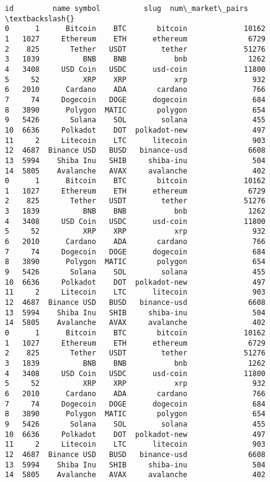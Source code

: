 \documentclass[11pt]{article}
\makeatletter
\newcommand{\boxspacing}{\kern\kvtcb@left@rule\kern\kvtcb@boxsep}
\newcommand{\prompt}[4]{
        {\ttfamily\llap{{\color{#2}[#3]:\hspace{3pt}#4}}\vspace{-\baselineskip}}
    }
\makeatother
\begin{document}
            \begin{tcolorbox}[breakable, size=fbox, boxrule=.5pt, pad at break*=1mm, opacityfill=0]
\prompt{Out}{outcolor}{49}{\boxspacing}
\begin{Verbatim}[commandchars=\\\{\}]
      id         name symbol          slug  num\_market\_pairs  \textbackslash{}
0      1      Bitcoin    BTC       bitcoin             10162
1   1027     Ethereum    ETH      ethereum              6729
2    825       Tether   USDT        tether             51276
3   1839          BNB    BNB           bnb              1262
4   3408     USD Coin   USDC      usd-coin             11800
5     52          XRP    XRP           xrp               932
6   2010      Cardano    ADA       cardano               766
7     74     Dogecoin   DOGE      dogecoin               684
8   3890      Polygon  MATIC       polygon               654
9   5426       Solana    SOL        solana               455
10  6636     Polkadot    DOT  polkadot-new               497
11     2     Litecoin    LTC      litecoin               903
12  4687  Binance USD   BUSD   binance-usd              6608
13  5994    Shiba Inu   SHIB     shiba-inu               504
14  5805    Avalanche   AVAX     avalanche               402
0      1      Bitcoin    BTC       bitcoin             10162
1   1027     Ethereum    ETH      ethereum              6729
2    825       Tether   USDT        tether             51276
3   1839          BNB    BNB           bnb              1262
4   3408     USD Coin   USDC      usd-coin             11800
5     52          XRP    XRP           xrp               932
6   2010      Cardano    ADA       cardano               766
7     74     Dogecoin   DOGE      dogecoin               684
8   3890      Polygon  MATIC       polygon               654
9   5426       Solana    SOL        solana               455
10  6636     Polkadot    DOT  polkadot-new               497
11     2     Litecoin    LTC      litecoin               903
12  4687  Binance USD   BUSD   binance-usd              6608
13  5994    Shiba Inu   SHIB     shiba-inu               504
14  5805    Avalanche   AVAX     avalanche               402
0      1      Bitcoin    BTC       bitcoin             10162
1   1027     Ethereum    ETH      ethereum              6729
2    825       Tether   USDT        tether             51276
3   1839          BNB    BNB           bnb              1262
4   3408     USD Coin   USDC      usd-coin             11800
5     52          XRP    XRP           xrp               932
6   2010      Cardano    ADA       cardano               766
7     74     Dogecoin   DOGE      dogecoin               684
8   3890      Polygon  MATIC       polygon               654
9   5426       Solana    SOL        solana               455
10  6636     Polkadot    DOT  polkadot-new               497
11     2     Litecoin    LTC      litecoin               903
12  4687  Binance USD   BUSD   binance-usd              6608
13  5994    Shiba Inu   SHIB     shiba-inu               504
14  5805    Avalanche   AVAX     avalanche               402


\end{Verbatim}
\end{tcolorbox}
\end{document}
